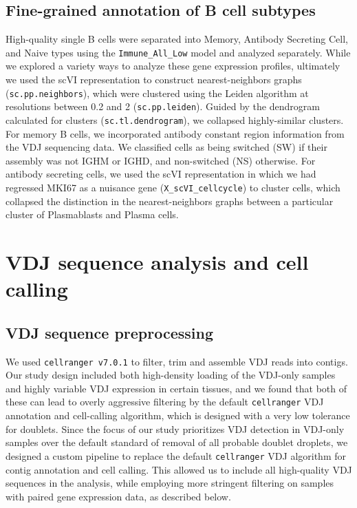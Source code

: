 \subsection{Fine-grained annotation of B cell subtypes}
High-quality single B cells were separated into Memory, Antibody Secreting Cell, and Naive types using the \verb|Immune_All_Low| model and analyzed separately. While we explored a variety ways to analyze these gene expression profiles, ultimately we used the scVI representation to construct nearest-neighbors graphs (\verb|sc.pp.neighbors|), which were clustered using the Leiden algorithm at resolutions between 0.2 and 2 (\verb|sc.pp.leiden|). Guided by the dendrogram calculated for clusters (\verb|sc.tl.dendrogram|), we collapsed highly-similar clusters. For memory B cells, we incorporated antibody constant region information from the VDJ sequencing data. We classified cells as being switched (SW) if their assembly was not IGHM or IGHD, and non-switched (NS) otherwise. For antibody secreting cells, we used the scVI representation in which we had regressed MKI67 as a nuisance gene (\verb|X_scVI_cellcycle|) to cluster cells, which collapsed the distinction in the nearest-neighbors graphs between a particular cluster of Plasmablasts and Plasma cells. 


\section{VDJ sequence analysis and cell calling}
\subsection{VDJ sequence preprocessing}
\label{sec:vdj_preprocessing}
\noindent We used \verb|cellranger v7.0.1| to filter, trim and assemble VDJ reads into contigs. Our study design included both high-density loading of the VDJ-only samples and highly variable VDJ expression in certain tissues, and we found that both of these can lead to overly aggressive filtering by the default \verb|cellranger| VDJ annotation and cell-calling algorithm,  which is designed with a very low tolerance for doublets. Since the focus of our study prioritizes VDJ detection in VDJ-only samples over the default standard of removal of all probable doublet droplets, we designed a custom pipeline to replace the default \verb|cellranger| VDJ algorithm for contig annotation and cell calling. This allowed us to include all high-quality VDJ sequences in the analysis, while employing more stringent filtering on samples with paired gene expression data, as described below.

